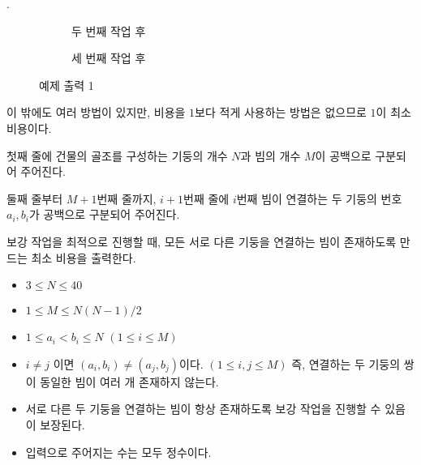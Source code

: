 \begin{problem}{\probno{}. \probtitle{}}
\begin{figure}[h!]
\begin{subfigure}[b]{.22\textwidth}
        \caption{두 번째 작업 후}
    \end{subfigure}%
    \hfill
    \begin{subfigure}[b]{.22\textwidth}
        \centering
        \caption{세 번째 작업 후}
    \end{subfigure}%
    \caption{예제 출력 1}
\end{figure}

이 밖에도 여러 방법이 있지만, 비용을 $1$보다 적게 사용하는 방법은 없으므로 $1$이 최소 비용이다.

\InputFile

첫째 줄에 건물의 골조를 구성하는 기둥의 개수 $N$과 빔의 개수 $M$이 공백으로 구분되어 주어진다.

둘째 줄부터 $M+1$번째 줄까지, $i+1$번째 줄에 $i$번째 빔이 연결하는 두 기둥의 번호 $a_i, b_i$가 공백으로 구분되어 주어진다.

\OutputFile

보강 작업을 최적으로 진행할 때, 모든 서로 다른 기둥을 연결하는 빔이 존재하도록 만드는 최소 비용을 출력한다.

\Constraints

\begin{itemize}[noitemsep]
    \item $3 \leq N \leq 40$
    \item $1 \leq M \leq N(N-1)/2$
    \item $1 \leq a_i < b_i \leq N$ $(1 \le i \le M)$ 
    \item $i \neq j$ 이면 $(a_i, b_i) \neq (a_j, b_j)$이다. $(1 \le i, j \le M)$ 즉, 연결하는 두 기둥의 쌍이 동일한 빔이 여러 개 존재하지 않는다.
    \item 서로 다른 두 기둥을 연결하는 빔이 항상 존재하도록 보강 작업을 진행할 수 있음이 보장된다.
    \item 입력으로 주어지는 수는 모두 정수이다.
\end{itemize}


\end{problem}
